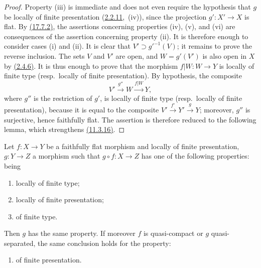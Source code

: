 \begin{proof}
Property (iii) is immediate and does not even require the hypothesis that $g$ be locally of finite presentation ({\hyperlink{ega4.c04.cor.2-2-11}{2.2.11}},~(iv)), since the projection $g':X'\to X$ is flat.
By {\hyperlink{ega4.c04.cor.17-7-2}{(17.7.2)}}, the assertions concerning properties (iv), (v), and (vi) are consequences of the assertion concerning property (ii).
It is therefore enough to consider cases (i) and (ii).
It is clear that $V'\supset g'^{-1}(V)$; it remains to prove the reverse inclusion.
The sets $V$ and $V'$ are open, and $W=g'(V')$ is also open in $X$ by {\hyperlink{ega4.c04.thm.2-4-6}{(2.4.6)}}.
It is thus enough to prove that the morphism $f|W:W\to Y$ is locally of finite type (resp.\ locally of finite presentation).
By hypothesis, the composite
\[
V'\xrightarrow{g''}W\xrightarrow{f|W}Y,
\]
where $g''$ is the restriction of $g'$, is locally of finite type (resp.\ locally of finite presentation), because it is equal to the composite $V'\xrightarrow{f'}Y'\xrightarrow{g}Y$; moreover, $g''$ is surjective, hence faithfully flat.
The assertion is therefore reduced to the following lemma, which strengthens {\hyperlink{ega4.c04.prop.11-3-16}{(11.3.16)}}.
\end{proof}

\begin{lemma}[17.7.5]
\label{IV.17.7.5}
Let $f:X\to Y$ be a faithfully flat morphism and locally of finite presentation, $g:Y\to Z$ a morphism such that $g\circ f:X\to Z$ has one of the following properties: being
\begin{enumerate}[label=(\roman*)]
  \item locally of finite type;
  \item locally of finite presentation;
  \item of finite type.
\end{enumerate}
Then $g$ has the same property.
If moreover $f$ is quasi-compact or $g$ quasi-separated, the same conclusion holds for the property:
\begin{enumerate}
  \item[(iv)] of finite presentation.
\end{enumerate}
\end{lemma}

